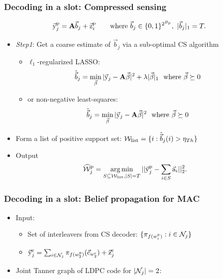 \begin{frame}\frametitle{Decoding in a slot: Compressed sensing}
	\begin{align*}
	\vec{\mathrm{y}}^{\mathrm{p}}_j	=\mathbf{A}\vec{b}_j+\vec{\mathrm{z}}^{\mathrm{p}}_i \qquad \text{where }\vec{b}_j\in\{0,1\}^{2^{B_{\mathrm{p}}}},~ |\vec{b}_j|_1=T.
	\end{align*}

\begin{itemize}
\item \emph{Step1}: Get a coarse estimate of $\vec{b}_j$ via a sub-optimal CS algorithm
	\begin{itemize}
	\item $\ell_1$-regularized LASSO: 
	\begin{align*}
		\hat{\vec{b}}_j&=\min_{\vec{\beta}} |\vec{\mathrm{y}}_j-\mathbf{A}\vec{\beta}|^2+\lambda |\vec{\beta}|_1~\text{ where }\vec{\beta} \succeq 0
	\end{align*}

	\item or non-negative least-squares: 
	\begin{align*}
		\hat{\vec{b}}_j &=\min_{\vec{\beta}} |\vec{\mathrm{y}}_j-\mathbf{A}\vec{\beta}|^2 ~\text{ where }\vec{\beta} \succeq 0
	\end{align*}

	\end{itemize}
\pause
\item Form a list of positive support set: $\mathcal{W}_{\text{list}}=\{i:\hat{\vec{b}}_j(i)>\eta_{Th}\}$
\item Output 
\[
\widehat{\mathcal{W}}_j^{\mathrm{p}}=\operatorname*{arg\,min}_{S\subseteq\mathcal{W}_{\text{list}},|S|=T}||\vec{\mathrm{y}}_j^{\mathrm{p}}-\sum_{i\in S}\vec{\mathrm{a}}_i||^2_2.
\]
\end{itemize}
\end{frame}


\begin{frame}\frametitle{Decoding in a slot: Belief propagation for MAC }
\begin{itemize}
	\item Input:
	\begin{itemize}
 	\item Set of interleavers from CS decoder: $\{\pi_{f(w^\mathrm{p}_i)}: i\in\mathcal{N}_j\}$
	\item  $\vec{\mathrm{y}}^{\mathrm{c}}_j=\sum_{i\in\mathcal{N}_j} \pi_{f(w^\mathrm{p}_2)}(\vec{c}_{w^\mathrm{c}_2}) +\vec{\mathrm{z}}^{\mathrm{c}}_j$
	\end{itemize}
	\item<2-> Joint Tanner graph of LDPC code for $|\mathcal{N}_j|=2$:
\end{itemize}
\end{frame}

